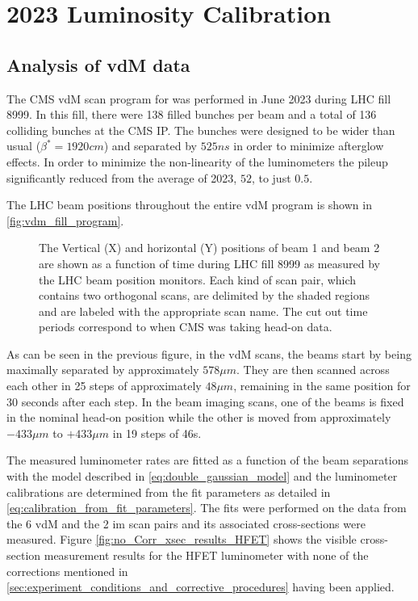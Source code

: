 \chapter{2023 Luminosity Calibration}
\label{ch:2023_luminosity_calibration}

\section{Analysis of vdM data}

The CMS vdM scan program for was performed in June 2023 during LHC fill 8999. In this fill, there were 138 filled bunches per beam and a total of 136 colliding bunches at the CMS IP. The bunches were designed to be wider than usual ($\beta^{*} = 1920 cm$) and separated by $525 ns$ in order to minimize afterglow effects. In order to minimize the non-linearity of the luminometers the pileup significantly reduced from the average of 2023, $52$, to just $0.5$.

The LHC beam positions throughout the entire vdM program is shown in \autoref{fig:vdm_fill_program}.

\begin{figure}[!htb]
	\centering
	\caption{The Vertical (X) and horizontal (Y) positions of beam 1 and beam 2 are shown as a function of time during LHC fill 8999 as measured by the LHC beam position monitors. Each kind of scan pair, which contains two orthogonal scans, are delimited by the shaded regions and are labeled with the appropriate scan name. The cut out time periods correspond to when CMS was taking head-on data.}
	\label{fig:vdm_fill_program}
\end{figure}

As can be seen in the previous figure, in the vdM scans, the beams start by being maximally separated by approximately $578 \mu m$. They are then scanned across each other in 25 steps of approximately $48 \mu m$, remaining in the same position for 30 seconds after each step. In the beam imaging scans, one of the beams is fixed in the nominal head-on position while the other is moved from approximately $-433 \mu m$ to $+433 \mu m$ in 19 steps of 46s.

The measured luminometer rates are fitted as a function of the beam separations with the model described in \autoref{eq:double_gaussian_model} and the luminometer calibrations are determined from the fit parameters as detailed in \autoref{eq:calibration_from_fit_parameters}. The fits were performed on the data from the 6 vdM and the 2 im scan pairs and its associated cross-sections were measured. Figure \autoref{fig:no_Corr_xsec_results_HFET} shows the visible cross-section measurement results for the HFET luminometer with none of the corrections mentioned in \autoref{sec:experiment_conditions_and_corrective_procedures} having been applied.

